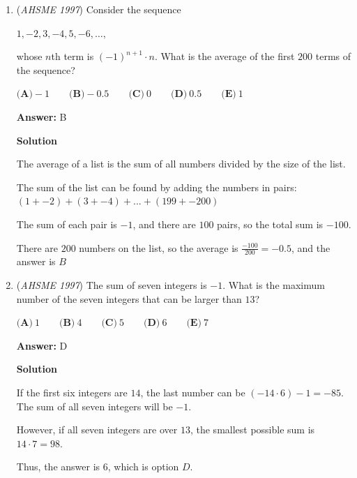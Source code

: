 \begin{enumerate}
Call the length $x$ and width $y$.$x+y$ is the width of the big rectangle, and $3y=2x$ is the length (2 lengths can form the big length, as can 3 widths).Now we have a system of equations:$\left\{\begin{matrix}3y=2x\\2(3y+(x+y))=176\end{matrix}\right.$This, after simplification, yields $80$!

 


	\item (\textit{AHSME 1997}) Consider the sequence 


 $1,-2,3,-4,5,-6,\ldots,$


 whose $n$th term is $(-1)^{n+1}\cdot n$. What is the average of the first $200$ terms of the sequence?


 $\textbf{(A)}-\!1\qquad\textbf{(B)}-\!0.5\qquad\textbf{(C)}\ 0\qquad\textbf{(D)}\ 0.5\qquad\textbf{(E)}\ 1$

 \textbf{Answer: }B



\textbf{Solution}

The average of a list is the sum of all numbers divided by the size of the list.

 The sum of the list can be found by adding the numbers in pairs:  $(1 + -2) + (3 + -4) + ... + (199 + -200)$

 The sum of each pair is $-1$, and there are $100$ pairs, so the total sum is $-100$.

 There are $200$ numbers on the list, so the average is $\frac{-100}{200} = -0.5$, and the answer is $\boxed{B}$



	\item (\textit{AHSME 1997}) The sum of seven integers is $-1$. What is the maximum number of the seven integers that can be larger than $13$?


 $\textbf{(A)}\ 1\qquad\textbf{(B)}\ 4\qquad\textbf{(C)}\ 5\qquad\textbf{(D)}\ 6\qquad\textbf{(E)}\ 7$

 \textbf{Answer: }D



\textbf{Solution}

If the first six integers are $14$, the last number can be $(-14\cdot 6) - 1 = -85$.  The sum of all seven integers will be $-1$.

 However, if all seven integers are over $13$, the smallest possible sum is $14\cdot 7 = 98$.

 Thus, the answer is $6$, which is option $\boxed{D}$.


\end{enumerate}
